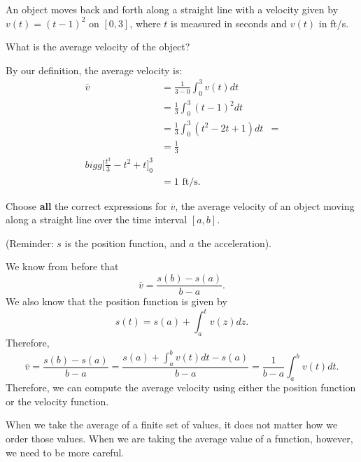 \documentclass{ximera}
\begin{document}
\begin{example}
An object moves back and forth along a straight line with a velocity
given by $v(t) = (t-1)^2$ on $[0,3]$, where $t$ is measured in seconds
and $v(t)$ in ft/s.

What is the average velocity of the object?
\begin{explanation}
By our definition, the average velocity is:
\begin{align*}
\overline{v}&=\frac{1}{3-0}\int_0^3v(t) dt\\
&=\frac{1}{3}\int_0^3 (t-1)^2 dt \\
&=\frac13 \int_0^3 (t^2-2t+1) dt&=\\
&= \frac13\\bigg[ \frac{t^3}{3}-t^2+t \bigg]_0^3\\
&= 1\text{ ft/s}.
\end{align*}
\end{explanation}
\end{example}
\begin{question}
Choose \textbf{all} the correct expressions for $\overline{v}$, the average velocity of an object moving along a straight line over the time interval $[a,b]$.

(Reminder: $s$ is the position function, and $a$ the acceleration). 
\begin{selectAll}






\end{selectAll}
\begin{feedback}
We know from before that
\[
\overline{v}=\frac{s(b)-s(a)}{b-a}.
\]
We also know that the position function is given by
\[
s(t)=s(a)+\int_a^tv(z) dz.
\]
Therefore,
\[
\overline{v}=\frac{s(b)-s(a)}{b-a}=\frac{s(a)+\int_a^bv(t) dt-s(a)}{b-a}=\frac{1}{b-a}\int_a^bv(t) dt.
\]
Therefore, we can compute the average velocity using either the position function or the velocity function.
\end{feedback}
\end{question}


When we take the average of a finite set of values, it does not matter
how we order those values.  When we are taking the average value of a
function, however, we need to be more careful.
\end{document}
